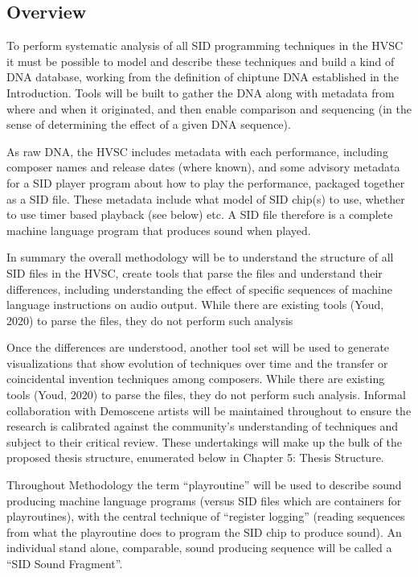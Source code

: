 \documentclass[10pt]{article}
\begin{document}
\begin{multicols*}{2}
    \subsection{Overview}

To perform systematic analysis of all SID programming techniques in the HVSC it must be possible to model and describe these techniques and build a kind of DNA database, working from the definition of chiptune DNA established in the Introduction. Tools will be built to gather the DNA along with metadata from where and when it originated, and then enable comparison and sequencing (in the sense of determining the effect of a given DNA sequence).

As raw DNA, the HVSC includes metadata with each performance, including composer names and release dates (where known), and some advisory metadata for a SID player program about how to play the performance, packaged together as a SID file. These metadata include what model of SID chip(s) to use, whether to use timer based playback (see below) etc. A SID file therefore is a complete machine language program that produces sound when played.

In summary the overall methodology will be to understand the structure of all SID files in the HVSC, create tools that parse the files and understand their differences, including understanding the effect of specific sequences of machine language instructions on audio output. While there are existing tools (Youd, 2020) to parse the files, they do not perform such analysis

Once the differences are understood, another tool set will be used to generate visualizations that show evolution of techniques over time and the transfer or coincidental invention techniques among composers. While there are existing tools (Youd, 2020) to parse the files, they do not perform such analysis. Informal collaboration with Demoscene artists will be maintained throughout to ensure the research is calibrated against the community’s understanding of techniques and subject to their critical review. These undertakings will make up the bulk of the proposed thesis structure, enumerated below in Chapter 5: Thesis Structure.

Throughout Methodology the term “playroutine” will be used to describe sound producing machine language programs (versus SID files which are containers for playroutines), with the central technique of “register logging” (reading sequences from what the playroutine does to program the SID chip to produce sound). An individual stand alone, comparable, sound producing sequence will be called a “SID Sound Fragment”.


\end{multicols*}
\end{document}
